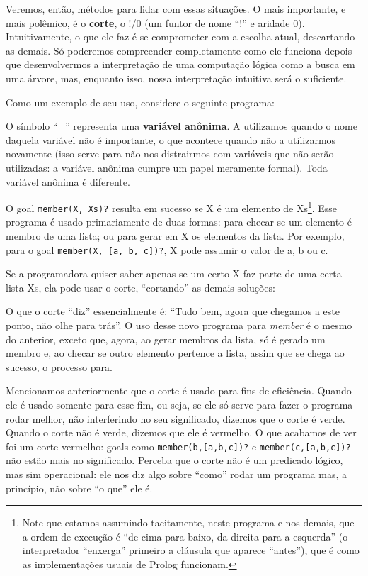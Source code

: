 \documentclass{article}
\begin{document}
Veremos, então, métodos para lidar com essas situações. O mais importante, e mais polêmico, é o \textbf{corte}, o !/0 (um funtor de nome ``!'' e aridade 0). Intuitivamente, o que ele faz é se comprometer com a escolha atual, descartando as demais. Só poderemos compreender completamente como ele funciona depois que desenvolvermos a interpretação de uma computação lógica como a busca em uma árvore, mas, enquanto isso, nossa interpretação intuitiva será o suficiente.

Como um exemplo de seu uso, considere o seguinte programa:



O símbolo ``\_'' representa uma \textbf{variável anônima}. A utilizamos quando o nome daquela variável não é importante, o que acontece quando não a utilizarmos novamente (isso serve para não nos distrairmos com variáveis que não serão utilizadas: a variável anônima cumpre um papel meramente formal). Toda variável anônima é diferente.

O goal {\tt member(X, Xs)?} resulta em sucesso se X é um elemento de Xs\footnote{Note que estamos assumindo tacitamente, neste programa e nos demais, que a ordem de execução é ``de cima para baixo, da direita para a esquerda'' (o interpretador ``enxerga'' primeiro a cláusula que aparece ``antes''), que é como as implementações usuais de Prolog funcionam.}. Esse programa é usado primariamente de duas formas: para checar se um elemento é membro de uma lista; ou para gerar em X os elementos da lista. Por exemplo, para o goal {\tt member(X, [a, b, c])?}, X pode assumir o valor de a, b ou c.

Se a programadora quiser saber apenas se um certo X faz parte de uma certa lista Xs, ela pode usar o corte, ``cortando'' as demais soluções:



O que o corte ``diz'' essencialmente é: ``Tudo bem, agora que chegamos a este ponto, não olhe para trás''. O uso desse novo programa para \textit{member} é o mesmo do anterior, exceto que, agora, ao gerar membros da lista, só é gerado um membro e, ao checar se outro elemento pertence a lista, assim que se chega ao sucesso, o processo para.

Mencionamos anteriormente que o corte é usado para fins de eficiência. Quando ele é usado somente para esse fim, ou seja, se ele só serve para fazer o programa rodar melhor, não interferindo no seu significado, dizemos que o corte é verde.
Quando o corte não é verde, dizemos que ele é vermelho. O que acabamos de ver foi um corte vermelho: goals como {\tt member(b,[a,b,c])?} e {\tt member(c,[a,b,c])?} não estão mais no significado. Perceba que o corte não é um predicado lógico, mas sim operacional: ele nos diz algo sobre ``como'' rodar um programa mas, a princípio, não sobre ``o que'' ele é.
\end{document}
